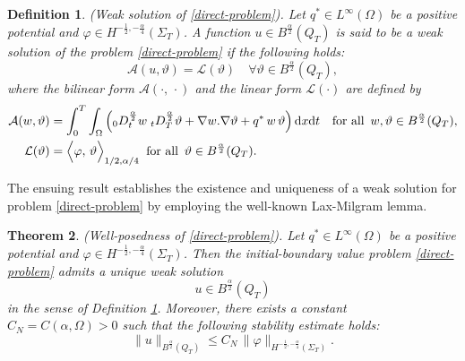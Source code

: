 \documentclass[a4paper,12pt,reqno,natbib]{amsart}
\newtheorem{theorem}{Theorem}
\newtheorem{definition}[theorem]{Definition}
\newcommand{\dx} {\displaystyle\mathrm{d}x}
\newcommand{\dt} {\displaystyle\mathrm{d}t}
\begin{document}
 

\begin{definition}\label{weak-solution}(Weak solution of \eqref{direct-problem}). Let $q^* \in L^\infty(\Omega)$ be a positive potential and $\varphi\in H^{-\frac{1}{2},-\frac{\alpha}{4} }\left(\Sigma_{T}\right)$. A function  $ u \in B^{\frac{\alpha}{2}}(Q_T)$ is said to
be a weak solution of the problem \eqref{direct-problem} if the following holds:
\begin{equation} \label{F.V}
    \mathcal{A}( u,\vartheta)=\mathcal{L}(\vartheta)\quad\forall\vartheta\in B^{\frac{\alpha}{2}}(Q_T),
\end{equation}
where the bilinear form $\mathcal{A}(\cdot,\, \cdot)$ and the linear form $\mathcal{L}(\cdot)$ are defined by
\begin{align*}
    \mathcal{A}(w,\vartheta)&=\int_0^T\int_{\Omega}\Big({}_0D^{\frac{\alpha}{2}}_t w\; {}_tD^{\frac{\alpha}{2}}_T\vartheta +\nabla w.\nabla\vartheta +q^*\,  w\,\vartheta\Big)\, \dx \dt\quad\hbox{for all }\, w,\vartheta\in B^{\frac{\alpha}{2}}(Q_T),\\
    \mathcal{L}(\vartheta)&= \Big<\varphi,\,\vartheta \Big>_{1/2,\alpha/4}\;\;\hbox{for all }\, \vartheta\in B^{\frac{\alpha}{2}}(Q_T).
\end{align*}
\end{definition}

The ensuing result establishes the existence and uniqueness of a weak solution for problem \eqref{direct-problem} by employing the well-known Lax-Milgram lemma.

\begin{theorem}\label{well-posedness-solution}(Well-posedness of \eqref{direct-problem}).
Let $q^* \in L^\infty(\Omega)$ be a positive potential and $\varphi \in H^{-\frac{1}{2}, -\frac{\alpha}{4}}(\Sigma_T)$. Then the initial-boundary value problem \eqref{direct-problem} admits a unique weak solution 
\[
u \in B^{\frac{\alpha}{2}}(Q_T)
\]
in the sense of Definition \ref{weak-solution}. Moreover, there exists a constant $C_N = C(\alpha,\Omega) > 0$ such that the following stability estimate holds:
\begin{equation}\label{estimation-direct}
    \| u \|_{B^{\frac{\alpha}{2}}(Q_T)} \leq C_N \, \|\varphi\|_{H^{-\frac{1}{2}, -\frac{\alpha}{4}}(\Sigma_T)}.
\end{equation}
\end{theorem}
\end{document}
